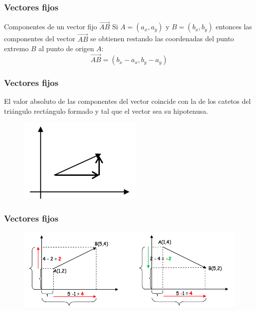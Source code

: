 \documentclass{beamer}
\begin{document}
\begin{frame}
  \frametitle{Vectores fijos}
  \begin{block}{Componentes de un vector fijo $\vec{AB}$}
Si $A=(a_x,a_y)$ y $B=(b_x,b_y)$ entonces las componentes del vector $\vec{AB}$ se obtienen restando las coordenadas del punto extremo $B$ al punto de origen $A$:
\[\vec{AB} = (b_x-a_x, b_y-a_y)\]
  \end{block}
\end{frame}




\begin{frame}
  \frametitle{Vectores fijos}
  El valor absoluto de las componentes del vector coincide con la de los catetos del tri\'angulo rect\'angulo formado y tal que el vector sea su hipotenusa. 
  
  
\begin{figure}[h]
    \label{fig:componentes}
\centering
\includegraphics[scale=0.5]{components}
\end{figure}


\end{frame}




\begin{frame}
  \frametitle{Vectores fijos}

  
\begin{figure}[h]
    \label{fig:ejemplo de componentes}
\centering
\includegraphics[width=\textwidth]{components_example}
\end{figure}


\end{frame}
\end{document}
